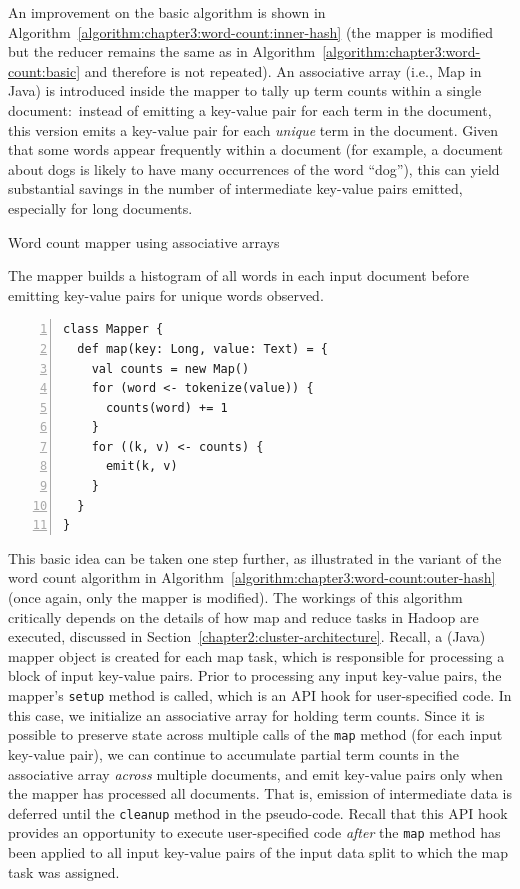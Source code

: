An improvement on the basic algorithm is shown in
Algorithm~\ref{algorithm:chapter3:word-count:inner-hash} (the mapper is
modified but the reducer remains the same as in
Algorithm~\ref{algorithm:chapter3:word-count:basic} and therefore is not
repeated).  An associative array (i.e., Map in Java) is introduced
inside the mapper to tally up term counts within a single
document:\ instead of emitting a key-value pair for each term in the
document, this version emits a key-value pair for each \emph{unique}
term in the document.  Given that some words appear frequently within
a document (for example, a document about dogs is likely to have many
occurrences of the word ``dog''), this can yield substantial savings
in the number of intermediate key-value pairs emitted, especially for
long documents.

\begin{algorithm}[t]
\caption{Word count mapper using associative arrays}
\label{algorithm:chapter3:word-count:inner-hash}
The mapper builds a histogram of all words in each input document
before emitting key-value pairs for unique words observed.
\begin{small}
\begin{Verbatim}[numbers=left, xleftmargin=7.5mm]
class Mapper {
  def map(key: Long, value: Text) = {
    val counts = new Map()
    for (word <- tokenize(value)) {
      counts(word) += 1
    }
    for ((k, v) <- counts) {
      emit(k, v)
    }
  }
}
\end{Verbatim}
\end{small}
\end{algorithm}

This basic idea can be taken one step further, as illustrated in the
variant of the word count algorithm in
Algorithm~\ref{algorithm:chapter3:word-count:outer-hash} (once again, only
the mapper is modified).  The workings of this algorithm critically
depends on the details of how map and reduce tasks in Hadoop are
executed, discussed in Section~\ref{chapter2:cluster-architecture}.
Recall, a (Java) mapper object is created for each map task, which is
responsible for processing a block of input key-value pairs.  Prior to
processing any input key-value pairs, the mapper's \texttt{setup}
method is called, which is an API hook for user-specified code.  In
this case, we initialize an associative array for holding term counts.
Since it is possible to preserve state across multiple calls of the
\texttt{map} method (for each input key-value pair), we can continue
to accumulate partial term counts in the associative array \emph{
  across} multiple documents, and emit key-value pairs only when the
mapper has processed all documents.  That is, emission of intermediate
data is deferred until the \texttt{cleanup} method in the pseudo-code.
Recall that this API hook provides an opportunity to execute
user-specified code \emph{after} the \texttt{map} method has been
applied to all input key-value pairs of the input data split to which
the map task was assigned.

